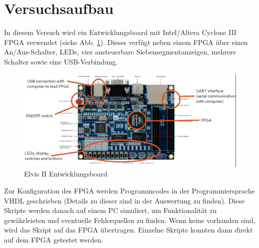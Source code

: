 \section{Versuchsaufbau}
In diesem Versuch wird ein Entwicklungsboard mit Intel/Altera Cyclone III FPGA verwendet (siehe Abb. \ref{board}).
Dieses verfügt neben einem FPGA über einen An/Aus-Schalter, LEDs, vier ansteuerbare Siebensegmentanzeigen, mehrere Schalter sowie eine USB-Verbindung.

\begin{figure}[h]
  \includegraphics[width=\linewidth]{../Daten/board.png}
  \caption{Elvis II Entwicklungsboard}
  \label{board}
\end{figure}

Zur Konfiguration des FPGA werden Programmcodes in der Programmiersprache VHDL geschrieben (Details zu dieser sind in der Auswertung zu finden).
Diese Skripte werden danach auf einem PC simuliert, um Funktionalität zu gewährleisten und eventuelle Fehlerquellen zu finden.
Wenn keine vorhanden sind, wird das Skript auf das FPGA übertragen.
Einzelne Skripte konnten dann direkt auf dem FPGA getestet werden.
